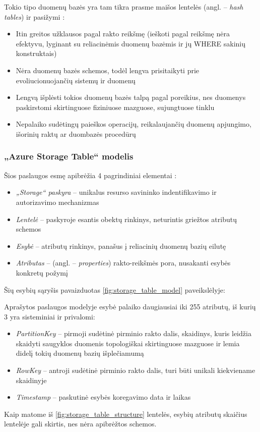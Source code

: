 Tokio tipo duomenų bazės yra tam tikra prasme maišos lentelės (angl. -- \textit{hash tables}) ir pasižymi \cite{KeyValueStores}:
\begin{itemize}
    \item Itin greitos užklausos pagal rakto reikšmę (ieškoti pagal reikšmę nėra efektyvu, lyginant su reliacinėmis duomenų bazėmis ir jų WHERE sakinių konstruktais)
    \item Nėra duomenų bazės schemos, todėl lengva prisitaikyti prie evoliucionuojančių sistemų ir duomenų
    \item Lengvą išplėsti tokios duomenų bazės talpą pagal poreikius, nes duomenys paskirstomi skirtinguose fiziniuose mazguose, sujungtuose tinklu
    \item Nepalaiko sudėtingų paieškos operacijų, reikalaujančių duomenų apjungimo, išorinių raktų ar duombazės procedūrų
\end{itemize}

\pagebreak

\subsubsection{„Azure Storage Table“ modelis}

Šios paslaugos esmę apibrėžia 4 pagrindiniai elementai \cite{TableStorageModel}:
\begin{itemize}
    \item \textit{„Storage“ paskyra} -- unikalus resurso savininko indentifikavimo ir autorizavimo mechanizmas
    \item \textit{Lentelė} -- paskyroje esantis obektų rinkinys, neturintis griežtos atributų schemos
    \item \textit{Esybė} -- atributų rinkinys, panašus į reliacinių duomenų bazių eilutę
    \item \textit{Atributas} -- (angl. -- \textit{properties}) rakto-reikšmės pora, nusakanti esybės konkretų požymį
\end{itemize}

Šių esybių sąryšis pavaizduotas \ref{fig:storage_table_model} paveikslėlyje:



Aprašytos paslaugos modelyje esybė palaiko daugiausiai iki 255 atributų, iš kurių 3 yra sisteminiai ir privalomi: \cite{TableStorageModel}

\begin{itemize}
    \item \textit{PartitionKey} -- pirmoji sudėtinė pirminio rakto dalis, skaidinys, kuris leidžia skaidyti saugyklos duomenis topologiškai skirtinguose mazguose ir lemia didelį tokių duomenų bazių išplečiamumą
    \item \textit{RowKey} -- antroji sudėtinė pirminio rakto dalis, turi būti unikali kiekviename skaidinyje
    \item \textit{Timestamp} -- paskutinė esybės koregavimo data ir laikas
\end{itemize}



Kaip matome iš \ref{fig:storage_table_structure} lentelės, esybių atributų skaičius lentelėje gali skirtis, nes nėra apibrėžtos schemos.